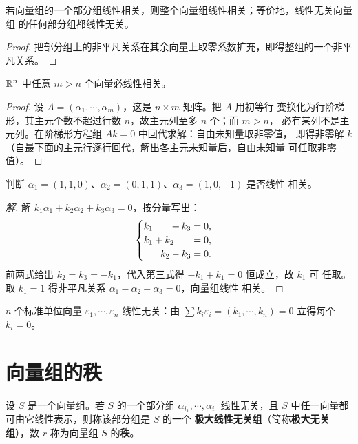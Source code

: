\begin{theorem}\label{thm:subset}
若向量组的一个部分组线性相关，则整个向量组线性相关；等价地，线性无关向量组
的任何部分组都线性无关。
\end{theorem}
\begin{proof}
把部分组上的非平凡关系在其余向量上取零系数扩充，即得整组的一个非平凡关系。
\end{proof}

\begin{theorem}\label{thm:more-than-n}
$\mathbb{R}^n$ 中任意 $m>n$ 个向量必线性相关。
\end{theorem}
\begin{proof}
设 $A=(\alpha_1,\cdots,\alpha_m)$，这是 $n\times m$ 矩阵。把 $A$ 用初等行
变换化为行阶梯形，其主元个数不超过行数 $n$，故主元列至多 $n$ 个；而 $m>n$，
必有某列不是主元列。在阶梯形方程组 $Ak=0$ 中回代求解：自由未知量取非零值，
即得非零解 $k$（自最下面的主元行逐行回代，解出各主元未知量后，自由未知量
可任取非零值）。
\end{proof}

\begin{example}
判断 $\alpha_1=(1,1,0)$、$\alpha_2=(0,1,1)$、$\alpha_3=(1,0,-1)$ 是否线性
相关。
\end{example}
\begin{proof}[解]
解 $k_1\alpha_1+k_2\alpha_2+k_3\alpha_3=0$，按分量写出：
\[
  \begin{cases}
    k_1\hphantom{+k_2}+k_3=0, \\
    k_1+k_2\hphantom{+k_3}=0, \\
    \hphantom{k_1+}k_2-k_3=0.
  \end{cases}
\]
前两式给出 $k_2=k_3=-k_1$，代入第三式得 $-k_1+k_1=0$ 恒成立，故 $k_1$ 可
任取。取 $k_1=1$ 得非平凡关系 $\alpha_1-\alpha_2-\alpha_3=0$，向量组线性
相关。
\end{proof}

\begin{example}
$n$ 个标准单位向量 $\varepsilon_1,\cdots,\varepsilon_n$ 线性无关：由
$\sum k_i\varepsilon_i=(k_1,\cdots,k_n)=0$ 立得每个 $k_i=0$。
\end{example}

\section{向量组的秩}\label{sec:vec-rank}

\begin{definition}\label{def:maximal-independent}
设 $S$ 是一个向量组。若 $S$ 的一个部分组 $\alpha_{i_1},\cdots,\alpha_{i_r}$
线性无关，且 $S$ 中任一向量都可由它线性表示，则称该部分组是 $S$ 的一个
\textbf{极大线性无关组}（简称\textbf{极大无关组}），数 $r$ 称为向量组 $S$
的\textbf{秩}。
\end{definition}


